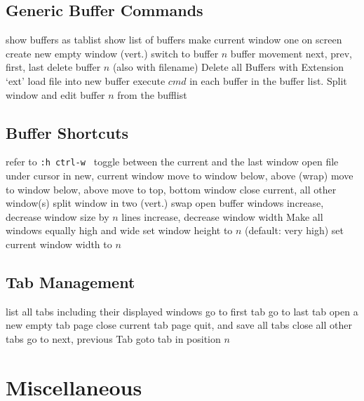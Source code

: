 \subsection{Generic Buffer Commands}	{}
	{show buffers as tablist}
	{show list of buffers}
	{make current window one on screen}
	{create new empty window (vert.)}
	{switch to buffer $n$}
	{buffer movement next, prev, first, last}
	{delete buffer $n$ (also with filename)}
	{Delete all Buffers with Extension `ext'}
	{load file into new buffer}
	{execute $cmd$ in each buffer in the buffer list.}
	{Split window and edit buffer $n$ from the bufflist}

\subsection{Buffer Shortcuts}	{refer to {\tt :h ctrl-w }}
\cmdS{\ctrl \^{} }	{toggle between the current and the last window}
	{open file under cursor in new, current window}
	{move to window below, above (wrap)}
	{move to window below, above}
	{move to top, bottom window}
	{close current, all other window(s)}
	{split window in two (vert.)}
	{swap open buffer windows }
	{increase, decrease window size by $n$ lines}
	{increase, decrease window width}
	{Make all windows equally high and wide}
	{set window height to $n$ (default: very high) }
	{set current window width to $n$ }

\subsection{Tab Management}	{}
	{list all tabs including their displayed windows}
	{go to first tab}
	{go to last tab}
	{open a new empty tab page}
	{close current tab page}
	{quit, and save all tabs}
	{close all other tabs}
	{go to next, previous Tab}
	{goto tab in position $n$ }

\section{Miscellaneous}	{}
